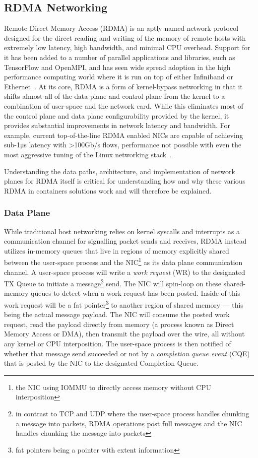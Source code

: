 \documentclass[12pt,titlepage]{article}
\begin{document}
\subsection{RDMA Networking}
Remote Direct Memory Access (RDMA) is an aptly named network protocol designed for the direct reading and writing of the memory of remote hosts with extremely low latency, high bandwidth, and minimal CPU overhead.
Support for it has been added to a number of parallel applications and libraries, such as TensorFlow and OpenMPI, and has seen wide spread adoption in the high performance computing world where it is run on top of either Infiniband or Ethernet~\cite{kim2019freeflow}.
At its core, RDMA is a form of kernel-bypass networking in that it shifts almost all of the data plane and control plane from the kernel to a combination of user-space and the network card.
While this eliminates most of the control plane and data plane configurability provided by the kernel, it provides substantial improvements in network latency and bandwidth.
For example, current top-of-the-line RDMA enabled NICs are capable of achieving sub-1\si{\micro\second} latency with >100Gb/s flows, performance not possible with even the most aggressive tuning of the Linux networking stack~\cite{mellanoxcx6doc,cloudflarelowlatency,intel800nic}.

Understanding the data paths, architecture, and implementation of network planes for RDMA itself is critical for understanding how and why these various RDMA in containers solutions work and will therefore be explained.

\subsubsection{Data Plane}
While traditional host networking relies on kernel syscalls and interrupts as a communication channel for signalling packet sends and receives, RDMA instead utilizes in-memory queues that live in regions of memory explicitly shared between the user-space process and the NIC\footnote{the NIC using IOMMU to directly access memory without CPU interposition} as its data plane communication channel.
A user-space process will write a \textit{work request} (WR) to the designated TX Queue to initiate a message\footnote{in contrast to TCP and UDP where the user-space process handles chunking a message into packets, RDMA operations post full messages and the NIC handles chunking the message into packets} send.
The NIC will spin-loop on these shared-memory queues to detect when a work request has been posted.
Inside of this work request will be a fat pointer\footnote{fat pointers being a pointer with extent information} to another region of shared memory --- this being the actual message payload.
The NIC will consume the posted work request, read the payload directly from memory (a process known as Direct Memory Access or DMA), then transmit the payload over the wire, all without any kernel or CPU interposition.
The user-space process is then notified of whether that message send succeeded or not by a \textit{completion queue event} (CQE) that is posted by the NIC to the designated Completion Queue.
\end{document}
